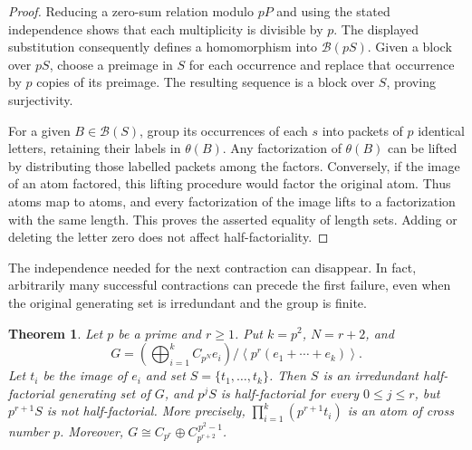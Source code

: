 \documentclass[11pt,reqno]{amsart}
\numberwithin{equation}{section}
\newtheorem{theorem}{Theorem}[section]
\theoremstyle{definition}
\theoremstyle{remark}
\newcommand{\B}{\mathcal B}
\begin{document}
\begin{proof}
Reducing a zero-sum relation modulo $pP$ and using the stated
independence shows that each multiplicity is divisible by $p$.
The displayed substitution consequently defines a homomorphism
into $\B(pS)$. Given a block over $pS$, choose a preimage in $S$
for each occurrence and replace that occurrence by $p$ copies of
its preimage. The resulting sequence is a block over $S$, proving
surjectivity.

For a given $B\in\B(S)$, group its occurrences of each $s$
into packets of $p$ identical letters, retaining their labels in
$\theta(B)$. Any factorization of $\theta(B)$ can be lifted by
distributing those labelled packets among the factors. Conversely,
if the image of an atom factored, this lifting procedure would
factor the original atom. Thus atoms map to atoms, and every
factorization of the image lifts to a factorization with the same
length. This proves the asserted equality of length sets. Adding
or deleting the letter zero does not affect half-factoriality.
\end{proof}

The independence needed for the next contraction can disappear.
In fact, arbitrarily many successful contractions can precede the
first failure, even when the original generating set is
irredundant and the group is finite.

\begin{theorem}\label{thm:delayed-contraction}
Let $p$ be a prime and $r\ge1$. Put $k=p^2$, $N=r+2$, and
\[
 G=\left(\bigoplus_{i=1}^{k}C_{p^N}e_i\right)
 \Big/\left\langle p^r(e_1+\cdots+e_k)\right\rangle.
\]
Let $t_i$ be the image of $e_i$ and set $S=\{t_1,\ldots,t_k\}$.
Then $S$ is an irredundant half-factorial generating set of $G$,
and $p^jS$ is half-factorial for every $0\le j\le r$, but
$p^{r+1}S$ is not half-factorial. More precisely,
$\prod_{i=1}^k(p^{r+1}t_i)$ is an atom of cross number $p$.
Moreover, $G\cong C_{p^r}\oplus C_{p^{r+2}}^{\,p^2-1}$.
\end{theorem}
\end{document}
